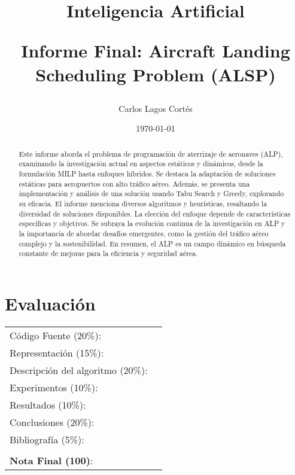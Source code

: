 \documentclass[letter, 10pt]{article}
\begin{document}
\title{Inteligencia Artificial \\ \begin{Large}Informe Final: Aircraft Landing Scheduling Problem (ALSP) \end{Large}}
\author{Carlos Lagos Cort\'es}
\date{\today}
\maketitle


\section*{Evaluaci\'on}

\begin{tabular}{ll}
C\'odigo Fuente (20\%): &  \underline{\hspace{2cm}}\\
Representaci\'on (15\%):  & \underline{\hspace{2cm}} \\
Descripci\'on del algoritmo (20\%):  & \underline{\hspace{2cm}} \\
Experimentos (10\%):  & \underline{\hspace{2cm}} \\
Resultados (10\%):  & \underline{\hspace{2cm}} \\
Conclusiones (20\%): &  \underline{\hspace{2cm}}\\
Bibliograf\'ia (5\%): & \underline{\hspace{2cm}}\\
 &  \\
\textbf{Nota Final (100)}:   & \underline{\hspace{2cm}}
\end{tabular}

\begin{abstract}
Este informe aborda el problema de programaci\'on de aterrizaje de aeronaves (ALP), examinando la investigaci\'on actual en aspectos est\'aticos y din\'amicos, desde la formulaci\'on MILP hasta enfoques h\'ibridos. Se destaca la adaptaci\'on de soluciones est\'aticas para aeropuertos con alto tr\'afico a\'ereo. Adem\'as, se presenta una implementaci\'on y an\'alisis de una soluci\'on usando Tabu Search y Greedy, explorando su eficacia. El informe menciona diversos algoritmos y heur\'isticas, resaltando la diversidad de soluciones disponibles. La elecci\'on del enfoque depende de caracter\'isticas espec\'ificas y objetivos. Se subraya la evoluci\'on continua de la investigaci\'on en ALP y la importancia de abordar desaf\'ios emergentes, como la gesti\'on del tr\'afico a\'ereo complejo y la sostenibilidad. En resumen, el ALP es un campo din\'amico en b\'usqueda constante de mejoras para la eficiencia y seguridad a\'erea.


\end{abstract}
\end{document}
